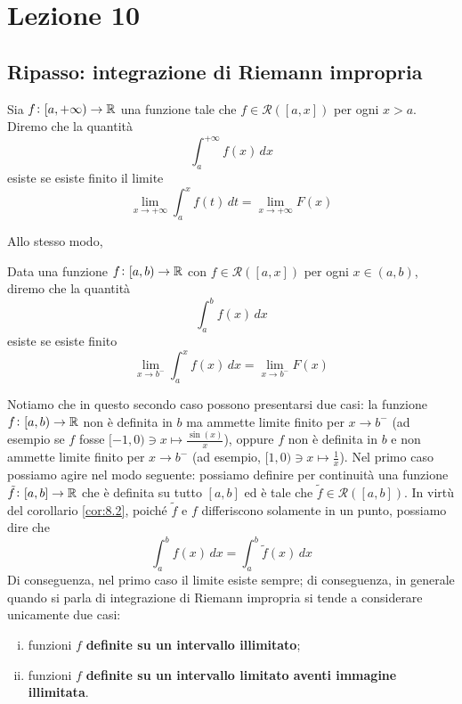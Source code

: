 \section{Lezione 10}
\subsection{Ripasso: integrazione di Riemann impropria}
\begin{definition}
    \label{def:10.1}
    Sia $f\colon[a,+\infty)\to \amsbb{R}$ una funzione tale che $f\in\mathscr{R}([a,x])$ per ogni $x>a$. Diremo che la quantità
    \[
    \int_a^{+\infty} f(x)\, dx
    \]
    esiste se esiste finito il limite
    \[
    \lim_{x\to +\infty} \int_a^x f(t)\, dt = \lim_{x\to+\infty} F(x)
    \]
\end{definition}
Allo stesso modo, 
\begin{definition}
    \label{def:10.2}
    Data una funzione $f\colon [a,b)\to\amsbb{R}$ con $f\in\mathscr{R}([a,x])$ per ogni $x\in(a,b)$, diremo che la quantità
    \[
    \int_a^b f(x)\, dx
    \]
    esiste se esiste finito
    \[
    \lim_{x\to b^-} \int_a^x f(x)\, dx = \lim_{x\to b^-} F(x)
    \]
\end{definition}
\begin{remark}
    Notiamo che in questo secondo caso possono presentarsi due casi: la funzione $f\colon[a,b)\to\amsbb{R}$ non è definita in $b$ ma ammette limite finito per $x\to b^-$ (ad esempio se $f$ fosse $[-1, 0)\ni x\mapsto \frac{\sin(x)}{x}$), oppure $f$ non è definita in $b$ e non ammette limite finito per $x\to b^-$ (ad esempio, $[1,0)\ni x\mapsto \frac{1}{x}$). Nel primo caso possiamo agire nel modo seguente: possiamo definire per continuità una funzione $\tilde{f}\colon[a,b]\to \amsbb{R}$ che è definita su tutto $[a,b]$ ed è tale che $\tilde{f}\in\mathscr{R}([a,b])$. In virtù del corollario \ref{cor:8.2}, poiché $\tilde{f}$ e $f$ differiscono solamente in un punto, possiamo dire che
    \[
    \int_a^b f(x)\, dx = \int_a^b \tilde{f}(x)\, dx
    \]
    Di conseguenza, nel primo caso il limite esiste sempre; di conseguenza, in generale quando si parla di integrazione di Riemann impropria si tende a considerare unicamente due casi:
    \begin{enumerate}[(i)]
        \item funzioni $f$ \textbf{definite su un intervallo illimitato};
        \item funzioni $f$ \textbf{definite su un intervallo limitato aventi immagine illimitata}.
    \end{enumerate}
\end{remark}
